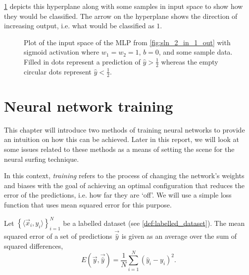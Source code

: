 \begin{example}
    \ref{fig:sigmoid_hyperplane} depicts this hyperplane along with some samples in input space to show how they would be classified. 
    The arrow on the hyperplane shows the direction of increasing output, i.e. what would be classified as $1$.
    \begin{figure}
        \centering
        \caption{Plot of the input space of the MLP from \ref{fig:sln_2_in_1_out} with sigmoid activation where $w_1=w_2=1$, $b=0$, and some sample data. Filled in dots represent a prediction of $\hat{y}>\frac{1}{2}$ whereas the empty circular dots represent $\hat{y}<\frac{1}{2}$.}
        \label{fig:sigmoid_hyperplane}
    \end{figure}
\end{example}

\chapter{Neural network training}
\label{chap:neural_training}
This chapter will introduce two methods of training neural networks to provide an intuition on how this can be achieved.
Later in this report, we will look at some issues related to these methods as a means of setting the scene for the neural surfing technique.

In this context, \textit{training} refers to the process of changing the network's weights and biases with the goal of achieving an optimal configuration that reduces the error of the predictions, i.e. how far they are `off'. 
We will use a simple loss function that uses mean squared error for this purpose.
\begin{definition}
    Let $\left\{\langle \vec{x}_i, y_i \rangle \right\}_{i=1}^N$ be a labelled dataset (see \ref{def:labelled_dataset}).
    The mean squared error of a set of predictions $\vec{\hat{y}}$ is given as an average over the sum of squared differences,
    \begin{equation}
        \label{eq:mean_squared_error}
        E\left( \vec{y}, \vec{\hat{y}} \right) = \frac{1}{N} \sum_{i=1}^N{\left(\hat{y}_i - y_i\right)^2}.
    \end{equation}
\end{definition}

